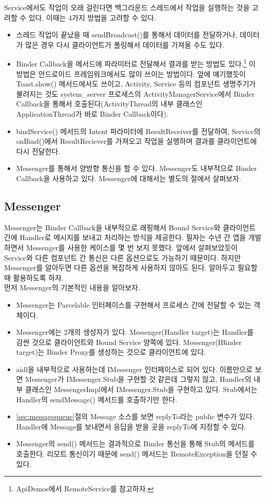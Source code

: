 Service에서도 작업이 오래 걸린다면 백그라운드 스레드에서 작업을 실행하는 것을 고려할 수 있다. 이때는 4가지 방법을 고려할 수 있다.
\begin{itemize}
\item 스레드 작업이 끝났을 때 sendBroadcast()를 통해서 데이터를 전달하거나, 데이터가 많은 경우 다시 클라이언트가 폴링해서 데이터를 가져올 수도 있다.
\item Binder Callback을 메서드에 파라미터로 전달해서 결과를 받는 방법도 있다.\footnote{ApiDemos에서 RemoteService를 참고하자.} 이 방법은 안드로이드 프레임워크에서도 많이 쓰이는 방법이다. 앞에 얘기했듯이 Toast.show() 메서드에서도 쓰이고, Activity, Service 등의 컴포넌트 생명주기가 불려지는 것도 system\_server 프로세스의 ActivityManagerService에서 Binder Callback을 통해서 호출된다(ActivityThread의 내부 클래스인 ApplicationThread가 바로 Binder Callback이다).
\item bindService() 메서드의 Intent 파라미터에 ResultReceiver를 전달하여, Service의 onBind()에서 ResultReciever를 가져오고 작업을 실행하며 결과를 클라이언트에 다시 전달한다.
\item Messenger를 통해서 양방향 통신을 할 수 있다. Messenger도 내부적으로 Binder Callback을 사용하고 있다. Messenger에 대해서는 별도의 절에서 살펴보자.
\end{itemize}

\subsection{Messenger}
\label{subsec:messenger}
Messenger는 Binder Callback을 내부적으로 래핑해서 Bound Service와 클라이언트 간에 Handler로 메시지를 보내고 처리하는 방식을 제공한다.
필자는 수년 간 앱을 개발하면서 Messenger를 사용한 케이스를 몇 번 보지 못했다. 
앞에서 살펴보았듯이 Service와 다른 컴포넌트 간 통신은 다른 옵션으로도 가능하기 때문이다. 
하지만 Messenger를 알아두면 다른 옵션을 복잡하게 사용하지 않아도 된다. 알아두고 필요할 때 활용하도록 하자.\\

먼저 Messenger의 기본적인 내용을 알아보자. 
\begin{itemize}
\item Messenger는 Parcelable 인터페이스를 구현해서 프로세스 간에 전달할 수 있는 객체이다.
\item Messenger에는 2개의 생성자가 있다. Messenger(Handler target)는 Handler를 감싼 것으로 클라이언트와 Bound Service 양쪽에 있다. Messenger(IBinder target)는 Binder Proxy를 생성하는 것으로 클라이언트에 있다.
\item aidl을 내부적으로 사용하는데 IMessenger 인터페이스로 되어 있다. 
이름만으로 보면 Messenger가 IMessenger.Stub을 구현할 것 같은데 그렇지 않고, Handler의 내부 클래스인 MessengerImpl에서 IMessenger.Stub을 구현하고 있다. Stub에서는 Handler의 sendMessage() 메서드를 호출하기만 한다.
\item \ref{sec:messagequeue}절의 Message 소스를 보면 replyTo라는 public 변수가 있다. Handler에 Message를 보내면서 응답을 받을 곳을 replyTo에 지정할 수 있다.
\item Messenger의 send() 메서드는 결과적으로 Binder 통신을 통해 Stub의 메서드를 호출한다. 리모트 통신이기 때문에 send() 메서드는 RemoteException을 던질 수 있다. 
\end{itemize}

